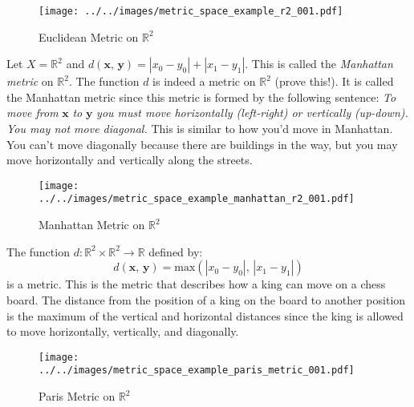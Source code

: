 \documentclass{article}
\theoremstyle{plain}
\theoremstyle{normal}
\newenvironment{example}{%
    \pushQED{\qed}\renewcommand{\qedsymbol}{$\blacksquare$}\examplex%
}{%
    \popQED\endexamplex%
}
\begin{document}
        \begin{figure}
            \centering
            \texttt{[image: ../../images/metric\_space\_example\_r2\_001.pdf]}
            \caption{Euclidean Metric on $\mathbb{R}^{2}$}
            \label{fig:metric_space_example_r2_001}
        \end{figure}
        \begin{example}
            Let $X=\mathbb{R}^{2}$ and
            $d(\mathbf{x},\,\mathbf{y})=|x_{0}-y_{0}|+|x_{1}-y_{1}|$. This is
            called the \textit{Manhattan metric} on $\mathbb{R}^{2}$.
            The function $d$ is indeed a metric on $\mathbb{R}^{2}$
            (prove this!). It is called the Manhattan metric since this metric
            is formed by the following sentence:
            \textit{To move from} $\mathbf{x}$ \textit{to} $\mathbf{y}$
            \textit{you must move horizontally (left-right) or vertically}
            \textit{(up-down). You may not move diagonal.}
            This is similar to how you'd move in Manhattan. You
            can't move diagonally because there are buildings in the way,
            but you may move horizontally and vertically along the streets.
        \end{example}
        \begin{figure}
            \centering
            \texttt{[image: ../../images/metric\_space\_example\_manhattan\_r2\_001.pdf]}
            \caption{Manhattan Metric on $\mathbb{R}^{2}$}
            \label{fig:metric_space_example_manhattan_r2_001}
        \end{figure}
        \begin{example}
            The function $d:\mathbb{R}^{2}\times\mathbb{R}^{2}\rightarrow\mathbb{R}$
            defined by:
            \begin{equation}
                d(\mathbf{x},\,\mathbf{y})=
                \textrm{max}(|x_{0}-y_{0}|,\,|x_{1}-y_{1}|)
            \end{equation}
            is a metric. This is the metric that describes how a king can move
            on a chess board. The distance from the position of a king on the
            board to another position is the maximum of the vertical and
            horizontal distances since the king is allowed to move horizontally,
            vertically, and diagonally.
        \end{example}
        \begin{figure}
            \centering
            \texttt{[image: ../../images/metric\_space\_example\_paris\_metric\_001.pdf]}
            \caption{Paris Metric on $\mathbb{R}^{2}$}
            \label{fig:metric_space_example_paris_metric_001}
        \end{figure}
\end{document}
